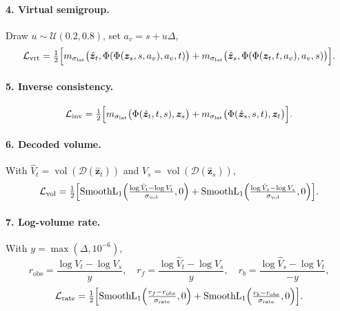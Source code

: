 \documentclass[11pt]{article}
\newcommand{\z}{\bm{z}}
\newcommand{\Loss}{\mathcal{L}}
\newcommand{\SL}{\operatorname{SmoothL}_1}
\newcommand{\vol}{\operatorname{vol}}
\newcommand{\Dec}{\mathcal{D}}
\begin{document}
\paragraph{4. Virtual semigroup.} Draw $u \sim \mathcal{U}(0.2, 0.8)$, set $a_v = s + u\Delta$,
\begin{equation}
  \Loss_{\mathrm{vrt}} = \tfrac{1}{2}\Bigl[
    m_{\sigma_{\mathrm{lat}}}\bigl(\hat{\z}_t, \Phi(\Phi(\z_s,s,a_v),a_v,t)\bigr)
  + m_{\sigma_{\mathrm{lat}}}\bigl(\hat{\z}_s, \Phi(\Phi(\z_t,t,a_v),a_v,s)\bigr) \Bigr].
\end{equation}

\paragraph{5. Inverse consistency.}
\begin{equation}
  \Loss_{\mathrm{inv}} = \tfrac{1}{2}\Bigl[
    m_{\sigma_{\mathrm{lat}}}\bigl(\Phi(\hat{\z}_t, t, s), \z_s\bigr)
  + m_{\sigma_{\mathrm{lat}}}\bigl(\Phi(\hat{\z}_s, s, t), \z_t\bigr) \Bigr].
\end{equation}

\paragraph{6. Decoded volume.} With $\hat{V}_t = \vol(\Dec(\hat{\z}_t))$ and
$\hat{V}_s = \vol(\Dec(\hat{\z}_s))$,
\begin{equation}
  \Loss_{\mathrm{vol}} = \tfrac{1}{2}\Bigl[
    \SL\Bigl(\tfrac{\log \hat{V}_t - \log V_t}{\sigma_{\mathrm{vol}}}, 0\Bigr) +
    \SL\Bigl(\tfrac{\log \hat{V}_s - \log V_s}{\sigma_{\mathrm{vol}}}, 0\Bigr) \Bigr].
\end{equation}

\paragraph{7. Log-volume rate.} With $y = \max(\Delta, 10^{-6})$,
\begin{equation}
  r_{\mathrm{obs}} = \frac{\log V_t - \log V_s}{y}, \quad
  r_f = \frac{\log \hat{V}_t - \log V_s}{y}, \quad
  r_b = \frac{\log \hat{V}_s - \log V_t}{-y},
\end{equation}
\begin{equation}
  \Loss_{\mathrm{rate}} = \tfrac{1}{2}\Bigl[
    \SL\Bigl(\tfrac{r_f - r_{\mathrm{obs}}}{\sigma_{\mathrm{rate}}}, 0\Bigr) +
    \SL\Bigl(\tfrac{r_b - r_{\mathrm{obs}}}{\sigma_{\mathrm{rate}}}, 0\Bigr) \Bigr].
\end{equation}
\end{document}
